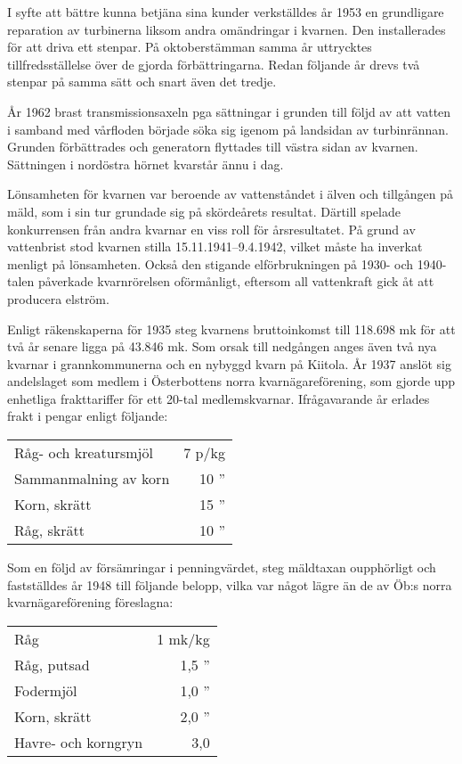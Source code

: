 I syfte att bättre kunna betjäna sina kunder verkställdes år 1953 en grundligare reparation av turbinerna liksom andra omändringar i kvarnen. Den  installerades för att driva ett stenpar. På oktoberstämman samma år uttrycktes tillfredsställelse över de gjorda förbättringarna. Redan följande år drevs två stenpar på samma sätt och snart även det tredje.

År 1962 brast transmissionsaxeln pga sättningar i grunden till följd av att vatten i samband med vårfloden började söka sig igenom på landsidan av turbinrännan. Grunden förbättrades och generatorn flyttades till västra sidan av kvarnen. Sättningen i nordöstra hörnet kvarstår ännu i dag.

Lönsamheten för kvarnen var beroende av vattenståndet i älven och tillgången på mäld, som i sin tur grundade sig på skördeårets resultat. Därtill spelade konkurrensen från andra kvarnar en viss roll för årsresultatet. På grund av vattenbrist stod kvarnen stilla 15.11.1941--9.4.1942, vilket måste ha inverkat menligt på lönsamheten. Också den stigande elförbrukningen på 1930- och 1940-talen påverkade kvarnrörelsen oförmånligt, eftersom all vattenkraft gick åt att producera elström.

Enligt räkenskaperna för 1935 steg kvarnens bruttoinkomst till 118.698 mk för att två år senare ligga på 43.846 mk. Som orsak till nedgången anges även två nya kvarnar i grannkommunerna och en nybyggd kvarn på Kiitola. År 1937 anslöt sig andelslaget som medlem i Österbottens norra kvarnägareförening, som gjorde upp enhetliga frakttariffer för ett 20-tal medlemskvarnar. Ifrågavarande år erlades frakt i pengar enligt följande:

\begin{center}
  \begin{tabular}{l r}
    \hline
    Råg- och kreatursmjöl & 7  p/kg \\
    Sammanmalning av korn	&	10 '' \\
    Korn, skrätt &	15 '' \\
    Råg, skrätt	&	10 '' \\
    \hline
  \end{tabular}
\end{center}
Som en följd av försämringar i penningvärdet, steg mäldtaxan oupphörligt och fastställdes år 1948 till följande belopp, vilka var något lägre än de av Öb:s norra kvarnägareförening föreslagna:
\begin{center}
  \begin{tabular}{l r}
    \hline
    Råg & 1 mk/kg \\
    Råg, putsad & 1,5 '' \\
    Fodermjöl & 1,0 '' \\
    Korn, skrätt & 2,0 '' \\
    Havre- och korngryn & 3,0 \\
    \hline
  \end{tabular}
\end{center}

